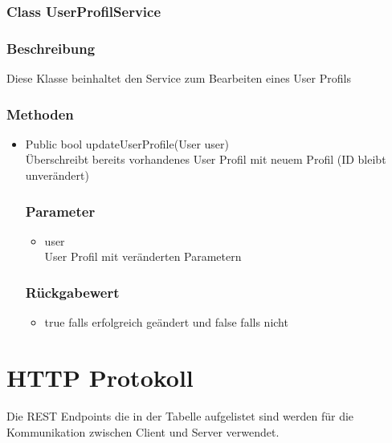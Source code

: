 \documentclass[a4paper]{scrreprt}
\begin{document}
\subsubsection{Class UserProfilService}
\subsubsection*{Beschreibung}
Diese Klasse beinhaltet den Service zum Bearbeiten eines User Profils

\subsubsection*{Methoden}
\begin{addmargin}[25pt]{0pt}
\begin{itemize}

\item Public bool updateUserProfile(User user)\\
	Überschreibt bereits vorhandenes User Profil mit neuem Profil (ID bleibt unverändert)
	\subsubsection*{Parameter}
	\begin{itemize}
	\item user \\
		User Profil mit veränderten Parametern
	\end{itemize}
	\subsubsection*{Rückgabewert}
	\begin{itemize}
	\item true falls erfolgreich geändert und false falls nicht
	\end{itemize}

\end{itemize}
\end{addmargin}


\section{HTTP Protokoll}

Die REST Endpoints die in der Tabelle aufgelistet sind werden für die Kommunikation zwischen Client und Server verwendet. \\
\end{document}
